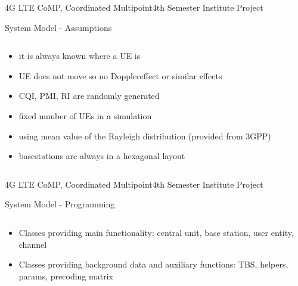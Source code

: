 \documentclass[xcolor={cmyk}]{beamer}
\begin{document}
 \begin{frame}{4G LTE CoMP, Coordinated Multipoint}{4th Semester Institute Project}
	 \begin{block}{System Model - Assumptions}
	 	\begin{columns}
			\begin{column}{.9\textwidth}
				\begin{itemize}
					\item it is always known where a UE is 
					\item UE does not move so no Dopplereffect or similar effects
					\item CQI, PMI, RI are randomly generated
					\item fixed number of UEs in a simulation
					\item using mean value of the Rayleigh distribution (provided from 3GPP)
					\item basestations are always in a hexagonal layout
				\end{itemize}
			\end{column}
		\end{columns}
	 \end{block}
 \end{frame}
 
 \begin{frame}{4G LTE CoMP, Coordinated Multipoint}{4th Semester Institute Project}
	 \begin{block}{System Model - Programming}
	 	\begin{columns}
			\begin{column}{.9\textwidth}
				\begin{itemize}
					\item Classes providing main functionality: central unit, base station, user entity, channel
					\item Classes providing background data and auxiliary functions: TBS, helpers, params, precoding matrix
				\end{itemize}
			\end{column}
		\end{columns}
	 \end{block}
 \end{frame}
 
\end{document}
